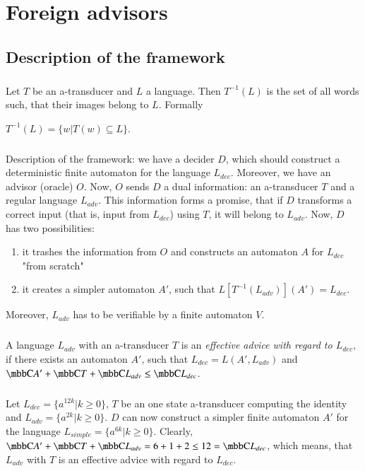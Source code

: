 \chapter{Foreign advisors}
\label{chap:advisors}

\section{Description of the framework}
\paragraph{}
 Let $T$ be an a-transducer and $L$ a language. Then $T^{-1}(L)$ is the set of all words such, that their images belong to $L$. Formally \\
\centerline{$T^{-1}(L) = \{ w | T(w) \subseteq L \}$.}

\paragraph{}
Description of the framework: we have a decider $D$, which should construct a deterministic finite automaton for the language $L_{dec}$. Moreover, we have an advisor (oracle) $O$. Now, $O$ sends $D$ a dual information: an a-transducer $T$ and a regular language $L_{adv}$. This information forms a promise, that if $D$ transforms a correct input (that is, input from $L_{dec}$) using $T$, it will belong to $L_{adv}$. Now, $D$ has two possibilities:

\begin{enumerate}
\item it trashes the information from $O$ and constructs an automaton $A$ for $L_{dec}$ "from scratch"
\item it creates a simpler automaton $A'$, such that $L[T^{-1}(L_{adv})](A') = L_{dec}$.
\end{enumerate}

Moreover, $L_{adv}$ has to be verifiable by a finite automaton $V$.

\paragraph{}
 A language $L_{adv}$ with an a-transducer $T$ is an \emph{effective advice with regard to $L_{dec}$}, if there exists an automaton $A'$, such that $L_{dec} = L(A', L_{adv})$ and $\C{A'} + \C{T} + \C{L_{adv}} \leq	 \C{L_{dec}}$.

\paragraph{}
\cpriklad Let $L_{dec} = \{ a^{12k}| k \geq 0 \} $, $T$ be an one state a-transducer computing the identity and $L_{adv} = \{ a^{2k}| k \geq 0 \}$. $D$ can now construct a simpler finite automaton $A'$ for the language $L_{simple} = \{ a^{6k}| k \geq 0 \}$. Clearly, $\C{A'} + \C{T} + \C{L_{adv}} = 6 + 1 + 2 \leq 12 = \C{L_{dec}}$, which means, that $L_{adv}$ with $T$ is an effective advice with regard  to $L_{dec}$.


